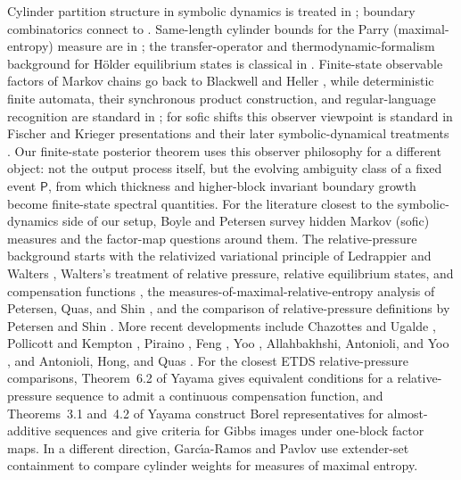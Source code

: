 \documentclass{etds}%
\numberwithin{equation}{section}
\theoremstyle{plain}
\theoremstyle{definition}
\theoremstyle{remark}
\begin{document}
Cylinder partition structure in symbolic dynamics is treated in
\cite{LindMarcus1995,Kitchens1998}; boundary combinatorics connect to
\cite{Fischer1975,Krieger1984,Boyle1983}.  Same-length cylinder bounds for the
Parry (maximal-entropy) measure are in \cite{Parry1964}; the transfer-operator
and thermodynamic-formalism background for H\"older equilibrium states is
classical in
\cite{Ruelle1978,ParryPollicott1990,Baladi2000,Bowen1975,WaltersErgodicTheory}.
Finite-state observable factors of Markov chains go back to Blackwell and
Heller \cite{Blackwell1957,Heller1965}, while deterministic finite automata,
their synchronous product construction, and regular-language recognition are
standard in \cite{HopcroftMotwaniUllman2001}; for sofic shifts this observer
viewpoint is standard in Fischer and Krieger presentations and their later
symbolic-dynamical treatments
\cite{Fischer1975,Krieger1984,Kitchens1998,LindMarcus1995}.  Our finite-state posterior
theorem uses this observer philosophy for a different object: not the output
process itself, but the evolving ambiguity class of a fixed event
$\mathsf{P}$, from which thickness and higher-block invariant boundary growth
become finite-state spectral quantities.
For the literature closest to the symbolic-dynamics side of our setup, Boyle
and Petersen \cite{BoylePetersen2011} survey hidden Markov (sofic) measures
and the factor-map questions around them.  The relative-pressure background
starts with the relativized variational principle of Ledrappier and Walters
\cite{LedrappierWalters1977}, Walters's treatment of relative pressure,
relative equilibrium states, and compensation functions
\cite{Walters1986RelativePressure}, the measures-of-maximal-relative-entropy
analysis of Petersen, Quas, and Shin \cite{PetersenQuasShin2003}, and the
comparison of relative-pressure definitions by Petersen and Shin
\cite{PetersenShin2005}.  More recent developments include Chazottes and
Ugalde \cite{ChazottesUgalde2003,ChazottesUgalde2011}, Pollicott and Kempton
\cite{PollicottKempton2011}, Piraino \cite{Piraino2018}, Feng
\cite{Feng2011FactorMaps}, Yoo \cite{Yoo2018Decomposition}, Allahbakhshi,
Antonioli, and Yoo \cite{AllahbakhshiAntonioliYoo2019}, and Antonioli, Hong,
and Quas \cite{AntonioliHongQuas2023}.  For the closest ETDS relative-pressure
comparisons, Theorem~6.2 of Yayama
\cite{Yayama2023RelativePressure} gives equivalent conditions for a
relative-pressure sequence to admit a continuous compensation function, and
Theorems~3.1 and~4.2 of Yayama
\cite{Yayama2026RelativePressureGibbs} construct Borel representatives for
almost-additive sequences and give criteria for Gibbs images under one-block
factor maps.  In a
different direction, Garc{\'\i}a-Ramos and Pavlov
\cite{GarciaRamosPavlov2019} use extender-set containment to compare cylinder
weights for measures of maximal entropy.
\end{document}
